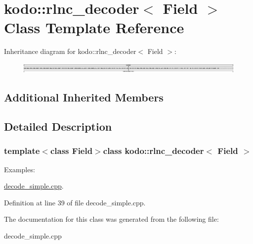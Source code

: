 \hypertarget{classkodo_1_1rlnc__decoder}{\section{kodo\-:\-:rlnc\-\_\-decoder$<$ Field $>$ Class Template Reference}
\label{classkodo_1_1rlnc__decoder}
}
Inheritance diagram for kodo\-:\-:rlnc\-\_\-decoder$<$ Field $>$\-:\begin{figure}[H]
\begin{center}
\leavevmode
\includegraphics[height=0.538807cm]{classkodo_1_1rlnc__decoder}
\end{center}
\end{figure}
\subsection*{Additional Inherited Members}


\subsection{Detailed Description}
\subsubsection*{template$<$class Field$>$class kodo\-::rlnc\-\_\-decoder$<$ Field $>$}

\begin{Desc}
\item[Examples\-: ]\par
\hyperlink{decode_simple_8cpp-example}{decode\-\_\-simple.\-cpp}.\end{Desc}


Definition at line 39 of file decode\-\_\-simple.\-cpp.



The documentation for this class was generated from the following file\-:\begin{DoxyCompactItemize}
\item 
decode\-\_\-simple.\-cpp\end{DoxyCompactItemize}
